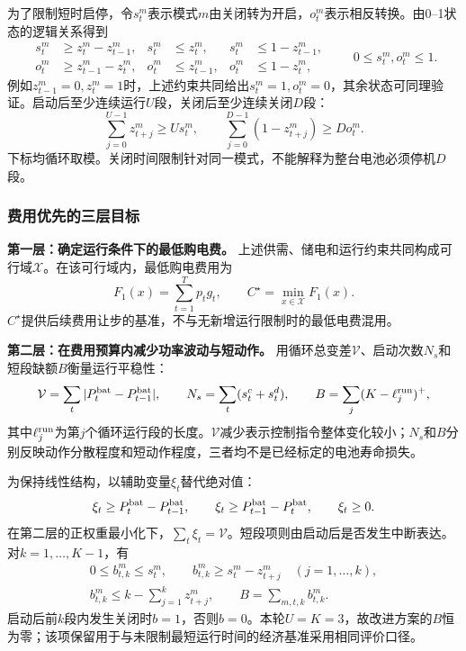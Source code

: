 \documentclass[withoutpreface,bwprint]{cumcmthesis}
\begin{document}
为了限制短时启停，令$s_t^m$表示模式$m$由关闭转为开启，$o_t^m$表示相反转换。由0--1状态的逻辑关系得到
\begin{equation}
 \begin{aligned}
 s_t^m&\geq z_t^m-z_{t-1}^m,&s_t^m&\leq z_t^m,&s_t^m&\leq1-z_{t-1}^m,\\
 o_t^m&\geq z_{t-1}^m-z_t^m,&o_t^m&\leq z_{t-1}^m,&o_t^m&\leq1-z_t^m,
 \end{aligned}
 \qquad 0\leq s_t^m,o_t^m\leq1 .
 \label{eq:q1-switch}
\end{equation}
例如$z_{t-1}^m=0,z_t^m=1$时，上述约束共同给出$s_t^m=1,o_t^m=0$，其余状态可同理验证。启动后至少连续运行$U$段，关闭后至少连续关闭$D$段：
\begin{equation}
 \sum_{j=0}^{U-1}z_{t+j}^m\geq Us_t^m,\qquad
 \sum_{j=0}^{D-1}(1-z_{t+j}^m)\geq Do_t^m .
 \label{eq:q1-duration}
\end{equation}
下标均循环取模。关闭时间限制针对同一模式，不能解释为整台电池必须停机$D$段。

\subsubsection{费用优先的三层目标}
\textbf{第一层：确定运行条件下的最低购电费。}
上述供需、储电和运行约束共同构成可行域$\mathcal X$。在该可行域内，最低购电费用为
\begin{equation}
 F_1(x)=\sum_{t=1}^{T}p_tg_t,\qquad C^\star=\min_{x\in\mathcal X}F_1(x).
 \label{eq:q1-first}
\end{equation}
$C^\star$提供后续费用让步的基准，不与无新增运行限制时的最低电费混用。

\textbf{第二层：在费用预算内减少功率波动与短动作。}
用循环总变差$\mathcal V$、启动次数$N_s$和短段缺额$B$衡量运行平稳性：
\begin{equation}
 \mathcal V=\sum_t|P_t^{\rm bat}-P_{t-1}^{\rm bat}|,\qquad
 N_s=\sum_t(s_t^c+s_t^d),\qquad B=\sum_j(K-\ell_j^{\rm run})^+ ,
 \label{eq:q1-diagnostics}
\end{equation}
其中$\ell_j^{\rm run}$为第$j$个循环运行段的长度。$\mathcal V$减少表示控制指令整体变化较小；$N_s$和$B$分别反映动作分散程度和短动作程度，三者均不是已经标定的电池寿命损失。

为保持线性结构，以辅助变量$\xi_t$替代绝对值：
\begin{equation}
 \xi_t\geq P_t^{\rm bat}-P_{t-1}^{\rm bat},\qquad
 \xi_t\geq P_{t-1}^{\rm bat}-P_t^{\rm bat},\qquad \xi_t\geq0 .
 \label{eq:q1-tv-linear}
\end{equation}
在第二层的正权重最小化下，$\sum_t\xi_t=\mathcal V$。短段项则由启动后是否发生中断表达。对$k=1,\ldots,K-1$，有
\begin{equation}
 \begin{gathered}
 0\leq b_{t,k}^m\leq s_t^m,\qquad
 b_{t,k}^m\geq s_t^m-z_{t+j}^m\quad(j=1,\ldots,k),\\
 b_{t,k}^m\leq k-\sum_{j=1}^{k}z_{t+j}^m,\qquad
 B=\sum_{m,t,k}b_{t,k}^m .
 \end{gathered}
 \label{eq:q1-short}
\end{equation}
启动后前$k$段内发生关闭时$b=1$，否则$b=0$。本轮$U=K=3$，故改进方案的$B$恒为零；该项保留用于与未限制最短运行时间的经济基准采用相同评价口径。
\end{document}
